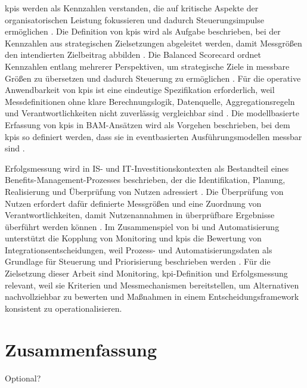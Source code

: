 \glspl{kpi} werden als Kennzahlen verstanden, die auf kritische Aspekte der organisatorischen Leistung fokussieren und dadurch Steuerungsimpulse ermöglichen \cite{Parmenter2015KPI}. 
Die Definition von \glspl{kpi} wird als Aufgabe beschrieben, bei der Kennzahlen aus strategischen Zielsetzungen abgeleitet werden, damit Messgrößen den intendierten Zielbeitrag abbilden \cite{KaplanNorton1996BSC}. 
Die Balanced Scorecard ordnet Kennzahlen entlang mehrerer Perspektiven, um strategische Ziele in messbare Größen zu übersetzen und dadurch Steuerung zu ermöglichen \cite{KaplanNorton1996BSC}. 
Für die operative Anwendbarkeit von \glspl{kpi} ist eine eindeutige Spezifikation erforderlich, weil Messdefinitionen ohne klare Berechnungslogik, Datenquelle, Aggregationsregeln und Verantwortlichkeiten nicht zuverlässig vergleichbar sind \cite{Parmenter2015KPI}. 
Die modellbasierte Erfassung von \glspl{kpi} in BAM-Ansätzen wird als Vorgehen beschrieben, bei dem \glspl{kpi} so definiert werden, dass sie in eventbasierten Ausführungsmodellen messbar sind \cite{Wetzstein2008BAM}. 

Erfolgsmessung wird in IS- und IT-Investitionskontexten als Bestandteil eines Benefits-Management-Prozesses beschrieben, der die Identifikation, Planung, Realisierung und Überprüfung von Nutzen adressiert \cite{WardDaniel2006Benefits}. 
Die Überprüfung von Nutzen erfordert dafür definierte Messgrößen und eine Zuordnung von Verantwortlichkeiten, damit Nutzenannahmen in überprüfbare Ergebnisse überführt werden können \cite{WardDaniel2006Benefits}. 
Im Zusammenspiel von \gls{bi} und Automatisierung unterstützt die Kopplung von Monitoring und \glspl{kpi} die Bewertung von Integrationsentscheidungen, weil Prozess- und Automatisierungsdaten als Grundlage für Steuerung und Priorisierung beschrieben werden \cite{Grigori2004BPI,Wetzstein2008BAM}. 
Für die Zielsetzung dieser Arbeit sind Monitoring, \gls{kpi}-Definition und Erfolgsmessung relevant, weil sie Kriterien und Messmechanismen bereitstellen, um Alternativen nachvollziehbar zu bewerten und Maßnahmen in einem Entscheidungsframework konsistent zu operationalisieren.


\section*{Zusammenfassung}
Optional?